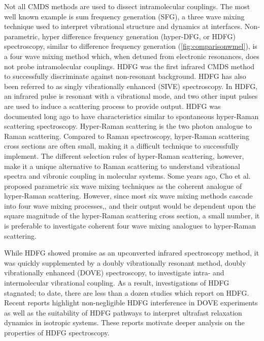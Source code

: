 \documentclass[aip, jcp, reprint, onecolumn]{revtex4-2}
\begin{document}
Not all CMDS methods are used to dissect intramolecular couplings.\cite{Shen1987_CPL}
The most well known example is sum frequency generation (SFG), a three wave mixing technique used to interpret vibrational structure and dynamics at interfaces. \cite{RN224, Piontek2023}
Non-parametric, hyper difference frequency generation (hyper-DFG, or HDFG) spectroscopy, similar to difference frequency generation (\autoref{fig:comparisonwmel}), is a four wave mixing method which, when detuned from  electronic resonances, does not probe intramolecular couplings. 
HDFG was the first infrared CMDS method to successfully discriminate against non-resonant background.\cite{RN351, RN352}
HDFG has also been referred to as singly vibrationally enhanced (SIVE) spectroscopy. \cite{RN351}
In HDFG, an infrared pulse is resonant with a vibrational mode, and two other input pulses are used to induce a scattering process to provide output.
HDFG was documented long ago to have characteristics similar to spontaneous hyper-Raman scattering spectroscopy. \cite{RN352}
Hyper-Raman scattering is the two photon analogue to Raman scattering. \cite{Cyvin1965, Terhune1965, Kozich2007}
Compared to Raman spectroscopy, hyper-Raman scattering cross sections are often small, making it a difficult technique to successfully implement.\cite{RN515, Kelley2010} 
The different selection rules of hyper-Raman scattering, however, make it a unique alternative to Raman scattering to understand vibrational spectra and vibronic coupling in molecular systems.
Some years ago, Cho et al. proposed parametric six wave mixing techniques as the coherent analogue of hyper-Raman scattering. \cite{Cho1997, Cho1998}
However, since most six wave mixing methods cascade into four wave mixing processes,\cite{RN243, Cho2000_Cascade}, and their output would be dependent upon the square magnitude of the hyper-Raman scattering cross section, a small number,\cite{RN515} it is preferable to investigate coherent four wave mixing analogues to hyper-Raman scattering.

While HDFG showed promise as an upconverted infrared spectroscopy method, it was quickly supplemented by a doubly vibrationally resonant method, doubly vibrationally enhanced (DOVE) spectroscopy, to investigate intra- and intermolecular vibrational coupling. \cite{RN345, RN101, Cho2000}
As a result, investigations of HDFG stagnated; to date, there are less than a dozen studies which report on HDFG. \cite{RN350, RN416, RN351, RN352, RN353, Chen1998, RN362, RN418, Bonn2024, McDonnell2024}
Recent reports highlight non-negligible HDFG interference in DOVE experiments as well as the suitability of HDFG pathways to interpret ultrafast relaxation dynamics in isotropic systems. \cite{Bonn2024, McDonnell2024}
These reports motivate deeper analysis on the properties of HDFG spectroscopy. 
\end{document}
